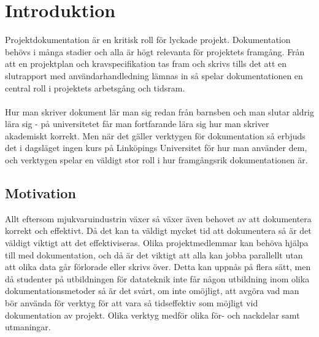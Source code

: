 

\chapter{Introduktion}
\label{cha:wassing-introduction}
Projektdokumentation är en kritisk roll för lyckade projekt. Dokumentation behövs i många stadier och alla är högt relevanta för projektets framgång. Från att en projektplan och kravspecifikation tas fram och skrivs tills det att en slutrapport med användarhandledning lämnas in så spelar dokumentationen en central roll i projektets arbetsgång och tidsram. 
\\ \\
Hur man skriver dokument lär man sig redan från barnsben och man slutar aldrig lära sig - på universitetet får man fortfarande lära sig hur man skriver akademiskt korrekt. Men när det gäller verktygen för dokumentation så erbjuds det i dagsläget ingen kurs på Linköpings Universitet för hur man använder dem, och verktygen spelar en väldigt stor roll i hur framgångsrik dokumentationen är.

\section{Motivation}
\label{sec:wassing-motivation}
Allt eftersom mjukvaruindustrin växer så växer även behovet av att dokumentera korrekt och effektivt. Då det kan ta väldigt mycket tid att dokumentera så är det väldigt viktigt att det effektiviseras. Olika projektmedlemmar kan behöva hjälpa till med dokumentation, och då är det viktigt att alla kan jobba parallellt utan att olika data går förlorade eller skrivs över. Detta kan uppnås på flera sätt, men då studenter på utbildningen för datateknik inte får någon utbildning inom olika dokumentationsmetoder så är det svårt, om inte omöjligt, att avgöra vad man bör använda för verktyg för att vara så tidseffektiv som möjligt vid dokumentation av projekt. Olika verktyg medför olika för- och nackdelar samt utmaningar.

